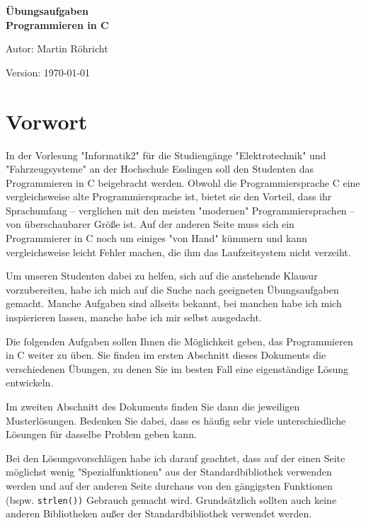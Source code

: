 \documentclass{coding-exercises}
\begin{document}
\begin{titlepage}
  \centering

  {\fontsize{40}{48}\bfseries\lato Übungsaufgaben\\Programmieren in C\par}

  {\Large Autor: Martin Röhricht}

  \vfill
  Version: \today
\end{titlepage}


\frontmatter
\chapter{Vorwort}

In der Vorlesung "Informatik2" für die Studiengänge "Elektrotechnik" und
"Fahrzeugsysteme" an der Hochschule Esslingen soll den Studenten das
Programmieren in C beigebracht werden. Obwohl die Programmiersprache C eine
vergleichsweise alte Programmiersprache ist, bietet sie den Vorteil, dass ihr
Sprachumfang -- verglichen mit den meisten "modernen" Programmiersprachen --
von überschaubarer Größe ist. Auf der anderen Seite muss sich ein Programmierer
in C noch um einiges "von Hand" kümmern und kann vergleichsweise leicht Fehler
machen, die ihm das Laufzeitsystem nicht verzeiht.

Um unseren Studenten dabei zu helfen, sich auf die anstehende Klausur
vorzubereiten, habe ich mich auf die Suche nach geeigneten Übungsaufgaben
gemacht. Manche Aufgaben sind allseits bekannt, bei manchen habe ich mich
inspierieren lassen, manche habe ich mir selbst ausgedacht.

Die folgenden Aufgaben sollen Ihnen die Möglichkeit geben, das Programmieren in
C weiter zu üben. Sie finden im ersten Abschnitt dieses Dokuments die
verschiedenen Übungen, zu denen Sie im besten Fall eine eigenständige Lösung
entwickeln.

Im zweiten Abschnitt des Dokuments finden Sie dann die jeweiligen
Musterlösungen. Bedenken Sie dabei, dass es häufig sehr viele unterschiedliche
Lösungen für dasselbe Problem geben kann.

Bei den Lösungsvorschlägen habe ich darauf geachtet, dass auf der einen Seite
möglichst wenig "Spezialfunktionen" aus der Standardbibliothek verwenden werden
und auf der anderen Seite durchaus von den gängigsten Funktionen (bspw.
\texttt{strlen())} Gebrauch gemacht wird. Grundsätzlich sollten auch
keine anderen Bibliotheken außer der Standardbibliothek verwendet werden.
\end{document}
